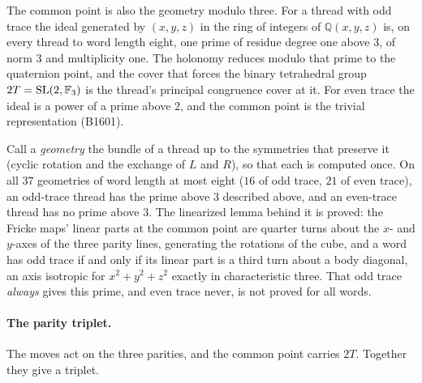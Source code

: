 The common point is also the geometry modulo three. For a thread with odd trace the ideal generated by $(x,y,z)$ in the
ring of integers of $\mathbb{Q}(x,y,z)$ is, on every thread to word length eight, one prime of residue degree one above
$3$, of norm $3$ and multiplicity one. The holonomy reduces modulo that prime to the quaternion point, and the cover
that forces the binary tetrahedral group $2T=\mathrm{SL}(2,\mathbb{F}_3)$ is the thread's principal congruence cover at it. For
even trace the ideal is a power of a prime above $2$, and the common point is the trivial representation (B1601).

\begin{censuslaw}\label{law:modthree}
Call a \emph{geometry} the bundle of a thread up to the symmetries that preserve it (cyclic rotation and the exchange of $L$
and $R$), so that each is computed once. On all $37$ geometries of word length at most eight ($16$ of odd trace, $21$ of even trace), an odd-trace thread has the
prime above $3$ described above, and an even-trace thread has no prime above $3$. The linearized lemma behind it is
proved: the Fricke maps' linear parts at the common point are quarter turns about the $x$- and $y$-axes of the three
parity lines, generating the rotations of the cube, and a word has odd trace if and only if its linear part is a
third turn about a body diagonal, an axis isotropic for $x^2+y^2+z^2$ exactly in characteristic three. That odd trace
\emph{always} gives this prime, and even trace never, is not proved for all words.
\end{censuslaw}

\paragraph{The parity triplet.}
The moves act on the three parities, and the common point carries $2T$. Together they give a triplet.

